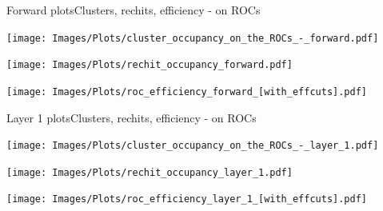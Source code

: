 \documentclass{beamer}
\begin{document}
\begin{frame}{Forward plots}{Clusters, rechits, efficiency - on ROCs}
  \hspace{0.01\textwidth}%
  \begin{minipage}{0.32\textwidth}
    \centering
    \texttt{[image: Images/Plots/cluster\_occupancy\_on\_the\_ROCs\_-\_forward.pdf]}
  \end{minipage}%
  \hspace{0.01\textwidth}%
  \begin{minipage}{0.32\textwidth}
    \centering
    \texttt{[image: Images/Plots/rechit\_occupancy\_forward.pdf]}
  \end{minipage}%
  \vspace*{0.2cm}
  \hspace{0.01\textwidth}%
  \begin{minipage}{0.32\textwidth}
    \centering
    \texttt{[image: Images/Plots/roc\_efficiency\_forward\_[with\_effcuts].pdf]}
  \end{minipage}
\end{frame}

\begin{frame}{Layer 1 plots}{Clusters, rechits, efficiency - on ROCs}
  \hspace{0.01\textwidth}%
  \begin{minipage}{0.32\textwidth}
    \centering
    \texttt{[image: Images/Plots/cluster\_occupancy\_on\_the\_ROCs\_-\_layer\_1.pdf]}
  \end{minipage}%
  \hspace{0.01\textwidth}%
  \begin{minipage}{0.32\textwidth}
    \centering
    \texttt{[image: Images/Plots/rechit\_occupancy\_layer\_1.pdf]}
  \end{minipage}%
  \vspace*{0.2cm}
  \hspace{0.01\textwidth}%
  \begin{minipage}{0.32\textwidth}
    \centering
    \texttt{[image: Images/Plots/roc\_efficiency\_layer\_1\_[with\_effcuts].pdf]}
  \end{minipage}
\end{frame}
\end{document}
